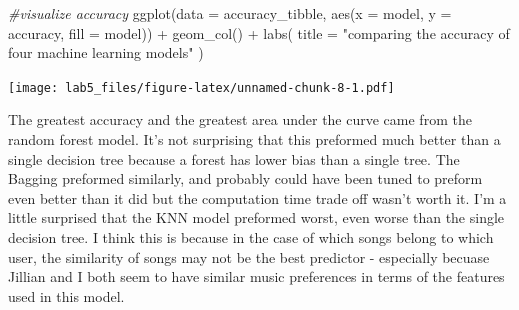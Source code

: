 \documentclass[
]{article}
\newenvironment{Shaded}{\begin{snugshade}}{\end{snugshade}}
\newcommand{\AttributeTok}[1]{\textcolor[rgb]{0.77,0.63,0.00}{#1}}
\newcommand{\CommentTok}[1]{\textcolor[rgb]{0.56,0.35,0.01}{\textit{#1}}}
\newcommand{\FunctionTok}[1]{\textcolor[rgb]{0.00,0.00,0.00}{#1}}
\newcommand{\NormalTok}[1]{#1}
\newcommand{\SpecialCharTok}[1]{\textcolor[rgb]{0.00,0.00,0.00}{#1}}
\newcommand{\StringTok}[1]{\textcolor[rgb]{0.31,0.60,0.02}{#1}}
\begin{document}
\begin{Shaded}
\begin{Highlighting}[]
\CommentTok{\#visualize accuracy}
\FunctionTok{ggplot}\NormalTok{(}\AttributeTok{data =}\NormalTok{ accuracy\_tibble,}
       \FunctionTok{aes}\NormalTok{(}\AttributeTok{x =}\NormalTok{ model,}
           \AttributeTok{y =}\NormalTok{ accuracy,}
           \AttributeTok{fill =}\NormalTok{ model)) }\SpecialCharTok{+}
  \FunctionTok{geom\_col}\NormalTok{() }\SpecialCharTok{+}
  \FunctionTok{labs}\NormalTok{(}
    \AttributeTok{title =} \StringTok{"comparing the accuracy of four machine learning models"}
\NormalTok{  )}
\end{Highlighting}
\end{Shaded}

\texttt{[image: lab5\_files/figure-latex/unnamed-chunk-8-1.pdf]}

The greatest accuracy and the greatest area under the curve came from
the random forest model. It's not surprising that this preformed much
better than a single decision tree because a forest has lower bias than
a single tree. The Bagging preformed similarly, and probably could have
been tuned to preform even better than it did but the computation time
trade off wasn't worth it. I'm a little surprised that the KNN model
preformed worst, even worse than the single decision tree. I think this
is because in the case of which songs belong to which user, the
similarity of songs may not be the best predictor - especially becuase
Jillian and I both seem to have similar music preferences in terms of
the features used in this model.
\end{document}
